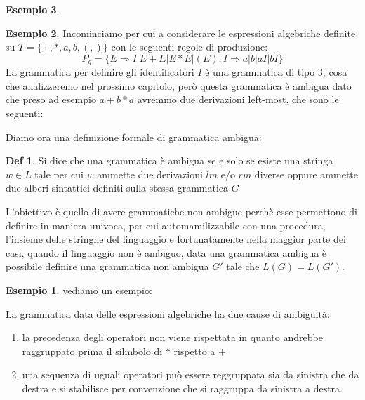 \documentclass[a4paper]{book}
\theoremstyle{definition}%
\newtheorem*{defi}{Def}%
\newtheorem*{esempio}{Esempio}
\begin{document}
\begin{esempio}
\begin{esempio}
  Incominciamo per cui a considerare le espressioni algebriche definite su $T = \{+, *, a, b, (, )\}$ con le seguenti regole di produzione:
  \begin{equation*}
    P_g = \{E \Rightarrow I | E + E | E * E | (E), I \Rightarrow a | b | aI | bI \}
  \end{equation*}
  La grammatica per definire gli identificatori $I$ è una grammatica di tipo 3, cosa che analizzeremo nel prossimo capitolo, però
  questa grammatica è ambigua dato che preso ad esempio $a + b * a$ avremmo due derivazioni left-most, che sono le seguenti:

  Diamo ora una definizione formale di grammatica ambigua:
  \begin{defi}
    Si dice che una grammatica è ambigua se e solo se esiste una stringa $w \in L$ tale per cui $w$ ammette due derivazioni $lm$ e/o $rm$
    diverse oppure ammette due alberi sintattici definiti sulla stessa grammatica $G$
  \end{defi}
  L'obiettivo è quello di avere grammatiche non ambigue perchè esse permettono di definire in maniera univoca, per cui automamilizzabile
  con una procedura, l'insieme delle stringhe del linguaggio e fortunatamente nella maggior parte dei casi, quando il linguaggio non è ambiguo,
  data una grammatica ambigua è possibile definire una grammatica non ambigua $G'$ tale che $L(G) = L(G')$.
\begin{esempio}
vediamo un esempio:

La grammatica data delle espressioni algebriche ha due cause di ambiguità:
\begin{enumerate}
  \item la precedenza degli operatori non viene rispettata in quanto andrebbe raggruppato prima il silmbolo di $*$ rispetto a $+$
  \item una sequenza di uguali operatori può essere reggruppata sia da sinistra che da destra e si stabilisce per convenzione
    che si raggruppa da sinistra a destra.
\end{enumerate}


\end{esempio}
\end{esempio}
\end{esempio}
\end{document}
